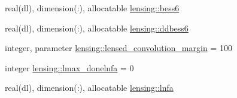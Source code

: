\begin{DoxyCompactItemize}
\item 
real(dl), dimension(\+:), allocatable \mbox{\hyperlink{namespacelensing_aba411bd5dd31565120f85d0a89b71ba5}{lensing\+::bess6}}
\item 
real(dl), dimension(\+:), allocatable \mbox{\hyperlink{namespacelensing_aae19084149f8642419ba2ae3f6b82b76}{lensing\+::ddbess6}}
\item 
integer, parameter \mbox{\hyperlink{namespacelensing_ae086e70cafd6706bebf9c49e4faa88e5}{lensing\+::lensed\+\_\+convolution\+\_\+margin}} = 100
\item 
integer \mbox{\hyperlink{namespacelensing_aa8604328cfd9ca10730507837b4867fe}{lensing\+::lmax\+\_\+donelnfa}} = 0
\item 
real(dl), dimension(\+:), allocatable \mbox{\hyperlink{namespacelensing_aa64764c9338c8a6fc4f30497223a0b67}{lensing\+::lnfa}}
\end{DoxyCompactItemize}
